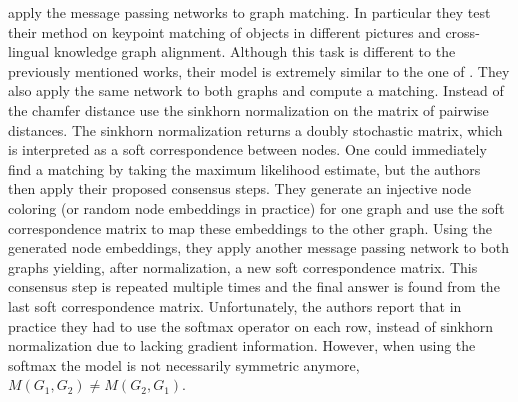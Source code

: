 \cite{fey2020_update} apply the message passing networks to graph matching. In particular they test their method on keypoint matching of objects in different pictures and cross-lingual knowledge graph alignment. Although this task is different to the previously mentioned works, their model is extremely similar to the one of \cite{riba2018}. They also apply the same network to both graphs and compute a matching. Instead of the chamfer distance \cite{fey2020_update} use the sinkhorn normalization \cite{sinkhorn2013} on the matrix of pairwise distances. The sinkhorn normalization returns a doubly stochastic matrix, which is interpreted as a soft correspondence between nodes. One could immediately find a matching by taking the maximum likelihood estimate, but the authors then apply their proposed consensus steps. They generate an injective node coloring (or random node embeddings in practice) for one graph and use the soft correspondence matrix to map these embeddings to the other graph. Using the generated node embeddings, they apply another message passing network to both graphs yielding, after normalization, a new soft correspondence matrix. This consensus step is repeated multiple times and the final answer is found from the last soft correspondence matrix. Unfortunately, the authors report that in practice they had to use the softmax operator on each row, instead of sinkhorn normalization due to lacking gradient information. However, when using the softmax the model is not necessarily symmetric anymore, $M(G_1, G_2) \neq M(G_2, G_1)$.






